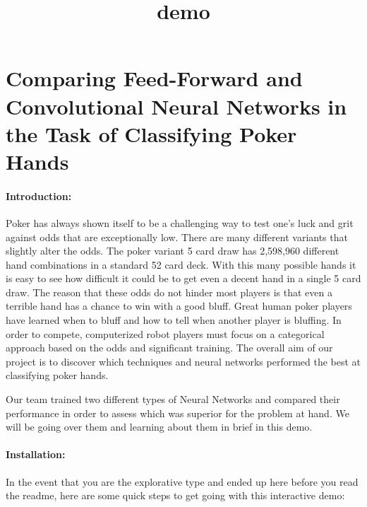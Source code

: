 \documentclass[11pt]{article}
\title{demo}
\begin{document}
    
    
    \maketitle
    
    

    
    \section{Comparing Feed-Forward and Convolutional Neural Networks in the
Task of Classifying Poker
Hands}\label{comparing-feed-forward-and-convolutional-neural-networks-in-the-task-of-classifying-poker-hands}

    \paragraph{Introduction:}\label{introduction}

    Poker has always shown itself to be a challenging way to test one's luck
and grit against odds that are exceptionally low. There are many
different variants that slightly alter the odds. The poker variant 5
card draw has 2,598,960 different hand combinations in a standard 52
card deck. With this many possible hands it is easy to see how difficult
it could be to get even a decent hand in a single 5 card draw. The
reason that these odds do not hinder most players is that even a
terrible hand has a chance to win with a good bluff. Great human poker
players have learned when to bluff and how to tell when another player
is bluffing. In order to compete, computerized robot players must focus
on a categorical approach based on the odds and significant training.
The overall aim of our project is to discover which techniques and
neural networks performed the best at classifying poker hands.

Our team trained two different types of Neural Networks and compared
their performance in order to assess which was superior for the problem
at hand. We will be going over them and learning about them in brief in
this demo.

    \paragraph{Installation:}\label{installation}

    In the event that you are the explorative type and ended up here before
you read the readme, here are some quick steps to get going with this
interactive demo:
\end{document}
